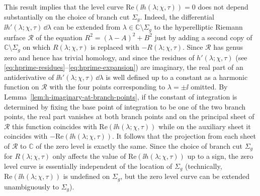 This result implies that the level curve $\mathrm{Re}(\ii h(\lambda;\chi,\tau))=0$ does not depend substantially on the choice of branch cut $\Sigma_g$.  Indeed, the differential $\ii h'(\lambda;\chi,\tau)\,\dd\lambda$ can be extended from $\lambda\in\mathbb{C}\setminus\Sigma_g$ to the hyperelliptic Riemann surface $\mathcal{R}$ of the equation $R^2=(\lambda-A)^2+B^2$ just by adding a second copy of $\mathbb{C}\setminus\Sigma_g$ on which $R(\lambda;\chi,\tau)$ is replaced with $-R(\lambda;\chi,\tau)$.  Since $\mathcal{R}$ has genus zero and hence has trivial homology, and since the residues of $h'(\lambda;\chi,\tau)$ (see \eqref{eq:hprime-residues}--\eqref{eq:hprime-expansion}) are imaginary, the real part of an antiderivative of $\ii h'(\lambda;\chi,\tau)\,\dd\lambda$ is well defined up to a constant as a harmonic function on $\mathcal{R}$ with the four points corresponding to $\lambda=\pm\ii$ omitted.  By 
Lemma~\ref{lem:h-imaginary-at-branch-points}, if the constant of integration is determined by fixing the base point of integration to be one of the two branch points, the real part vanishes at both branch points and on the principal sheet of $\mathcal{R}$ this function coincides with $\mathrm{Re}(\ii h(\lambda;\chi,\tau))$ while on the auxiliary sheet it coincides with $-\mathrm{Re}(\ii h(\lambda;\chi,\tau))$.  It follows that the projection from each sheet of $\mathcal{R}$ to $\mathbb{C}$ of the zero level is exactly the same.  Since the choice of branch cut $\Sigma_g$ for $R(\lambda;\chi,\tau)$ only affects the value of $\mathrm{Re}(\ii h(\lambda;\chi,\tau))$ up to a sign, the zero level curve is essentially independent of the location of $\Sigma_g$ (technically, $\mathrm{Re}(\ii h(\lambda;\chi,\tau))$ is undefined on $\Sigma_g$, but the zero level curve can be extended unambiguously to $\Sigma_g$). 

